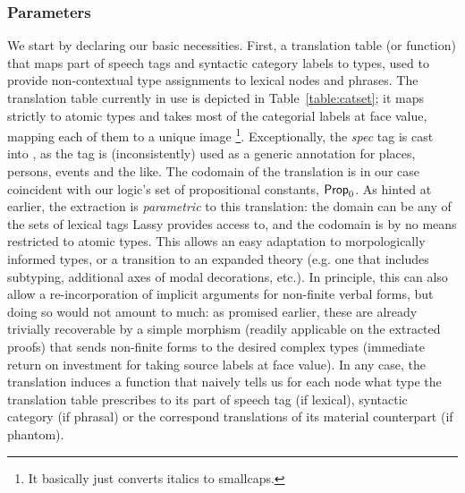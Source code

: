 \subsubsection{Parameters}
We start by declaring our basic necessities.
First, a translation table (or function) that maps part of speech tags and syntactic category labels to types, used to provide non-contextual type assignments to lexical nodes and phrases.
The translation table currently in use is depicted in Table~\ref{table:catset}; it maps strictly to atomic types and takes most of the categorial labels at face value, mapping each of them to a unique image%
\footnote{It basically just converts italics to smallcaps.}.
Exceptionally, the \textit{spec} tag is cast into , as the tag is (inconsistently) used as a generic annotation for places, persons, events and the like.
The codomain of the translation is in our case coincident with our logic's set of propositional constants, $\mathsf{Prop}_0$.
As hinted at earlier, the extraction is \textit{parametric} to this translation: the domain can be any of the sets of lexical tags Lassy provides access to, and the codomain is by no means restricted to atomic types.
This allows an easy adaptation to morpologically informed types, or a transition to an expanded theory (e.g. one that includes subtyping, additional axes of modal decorations, etc.). 
In principle, this can also allow a re-incorporation of implicit arguments for non-finite verbal forms, but doing so would not amount to much: as promised earlier, these are already trivially recoverable by a simple morphism (readily applicable on the extracted proofs) that sends non-finite forms to the desired complex types (immediate return on investment for taking source labels at face value).
In any case, the translation induces a function that naively tells us for each node what type the translation table prescribes to its part of speech tag (if lexical), syntactic category (if phrasal) or the correspond translations of its material counterpart (if phantom).

